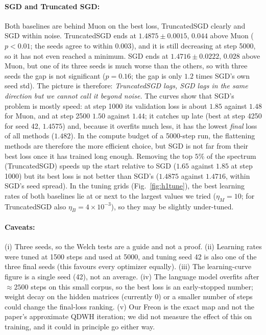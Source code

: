 \paragraph{SGD and Truncated SGD:}
Both baselines are behind Muon on the best loss, TruncatedSGD clearly and SGD within noise. TruncatedSGD ends at $1.4875\pm0.0015$, $0.044$ above Muon ($p<0.01$; the seeds agree to within $0.003$), and it is still decreasing at step 5000, so it has not even reached a minimum.
SGD ends at $1.4716\pm0.0222$, $0.028$ above Muon, but one of its three seeds is much worse than the others, so with three seeds the gap is not significant ($p=0.16$; the gap is only $1.2$ times SGD's own seed std). The picture
is therefore: \emph{TruncatedSGD lags, SGD lags in the same direction but we cannot call it beyond noise.}
The curves show that SGD's problem is mostly speed: at step 1000 its validation loss is about $1.85$ against $1.48$ for Muon, and at step 2500 $1.50$ against $1.44$; it catches up late (best at step 4250 for seed 42, $1.4575$) and, because it overfits much less, it has the lowest \emph{final} loss of all
methods ($1.482$). In the compute budget of a 5000-step run, the flattening methods are therefore the more efficient choice, but SGD is not far from their best loss once it has trained long enough.
Removing the top $5\%$ of the spectrum (TruncatedSGD) speeds up the start relative to SGD ($1.65$ against $1.85$ at step 1000) but its best loss is not better than SGD's ($1.4875$ against $1.4716$, within SGD's seed spread).
In the tuning grids (Fig.~\ref{fig:h1tune}), the best learning rates of both baselines lie at or next to the largest values we tried ($\eta_M=10$; for TruncatedSGD also $\eta_B=4\times10^{-3}$), so they may be slightly under-tuned.

\paragraph{Caveats:}
(i) Three seeds, so the Welch tests are a guide and not a proof. (ii) Learning rates were tuned at 1500 steps and used at 5000, and tuning seed 42 is also one of the three final seeds (this favours every optimizer equally).
(iii) The learning-curve figure is a single seed (42), not an average. (iv) The language model overfits after $\approx2500$ steps on this small corpus, so the best loss is an early-stopped number; weight decay on the hidden matrices (currently $0$) or a smaller number of steps could change the final-loss ranking.
(v) Our Freon is the exact map and not the paper's approximate QDWH iteration; we did not measure the effect of this on training, and it could in principle go either way.

